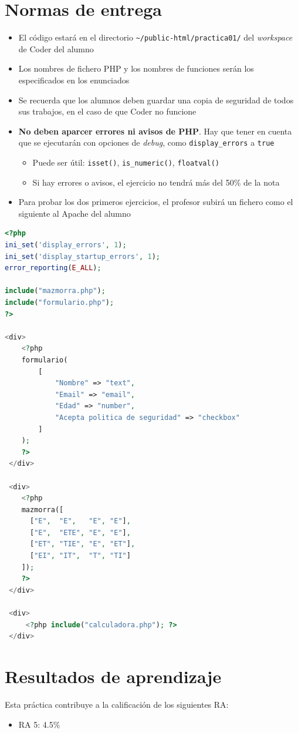 \documentclass[a4paper]{article}
\begin{document}
\section*{Normas de entrega}
\label{sec:org000000c}
\begin{itemize}
\item El código estará en el directorio \texttt{\textasciitilde{}/public-html/practica01/} del \emph{workspace} de Coder del alumno
\item Los nombres de fichero PHP y los nombres de funciones serán los especificados en los enunciados
\item Se recuerda que los alumnos deben guardar una copia de seguridad de todos sus trabajos, en el caso de que Coder no funcione
\item \textbf{No deben aparcer errores ni avisos de PHP}. Hay que tener en cuenta que se ejecutarán con opciones de \emph{debug}, como \texttt{display\_errors} a \texttt{true}
\begin{itemize}
\item Puede ser útil: \texttt{isset()}, \texttt{is\_numeric()}, \texttt{floatval()}
\item Si hay errores o avisos, el ejercicio no tendrá más del 50\% de la nota
\end{itemize}
\item Para probar los dos primeros ejercicios, el profesor subirá un fichero como el siguiente al Apache del alumno
\end{itemize}


\begin{lstlisting}[language=php,caption={Ejemplo de fichero de prueba},captionpos=b,numbers=none]
<?php
ini_set('display_errors', 1);
ini_set('display_startup_errors', 1);
error_reporting(E_ALL);

include("mazmorra.php");
include("formulario.php");
?>

<div>
    <?php
    formulario(
        [
            "Nombre" => "text",
            "Email" => "email",
            "Edad" => "number",
            "Acepta politica de seguridad" => "checkbox"
        ]
    );
    ?>
 </div>

 <div>
    <?php
    mazmorra([
      ["E",  "E",   "E", "E"],
      ["E",  "ETE", "E", "E"],
      ["ET", "TIE", "E", "ET"],
      ["EI", "IT",  "T", "TI"]
    ]);
    ?>
 </div>        

 <div>
     <?php include("calculadora.php"); ?>
 </div>    
\end{lstlisting}
\section*{Resultados de aprendizaje}
\label{sec:org000000f}
Esta práctica contribuye a la calificación de los siguientes RA:
\begin{itemize}
\item RA 5: 4.5\%
\end{itemize}
\end{document}
